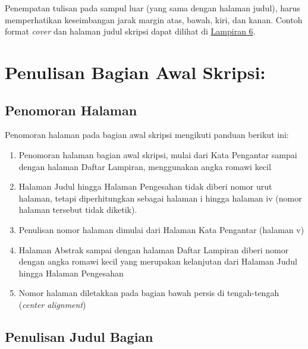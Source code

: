 \documentclass[
  indonesian,
  letterpaper,
]{scrbook}
\providecommand{\tightlist}{%
  \setlength{\itemsep}{0pt}\setlength{\parskip}{0pt}}
\begin{document}
Penempatan tulisan pada sampul luar (yang sama dengan halaman judul),
harus memperhatikan keseimbangan jarak margin atas, bawah, kiri, dan
kanan. Contoh format \emph{cover} dan halaman judul skripsi dapat
dilihat di \hyperref[_Lampiran_6_Contoh]{Lampiran 6}.

\section{Penulisan Bagian Awal
Skripsi:}\label{penulisan-bagian-awal-skripsi}

\subsection{Penomoran Halaman}\label{penomoran-halaman}

Penomoran halaman pada bagian awal skripsi mengikuti panduan berikut
ini:

\begin{enumerate}
\def\labelenumi{\alph{enumi}.}
\tightlist
\item
  Penomoran halaman bagian awal skripsi, mulai dari Kata Pengantar
  sampai dengan halaman Daftar Lampiran, menggunakan angka romawi kecil
\item
  Halaman Judul hingga Halaman Pengesahan tidak diberi nomor urut
  halaman, tetapi diperhitungkan sebagai halaman i hingga halaman iv
  (nomor halaman tersebut tidak diketik).
\item
  Penulisan nomor halaman dimulai dari Halaman Kata Pengantar (halaman
  v)
\item
  Halaman Abstrak sampai dengan halaman Daftar Lampiran diberi nomor
  dengan angka romawi kecil yang merupakan kelanjutan dari Halaman Judul
  hingga Halaman Pengesahan
\item
  Nomor halaman diletakkan pada bagian bawah persis di tengah-tengah
  (\emph{center alignment})
\end{enumerate}

\subsection{Penulisan Judul Bagian}\label{penulisan-judul-bagian}
\end{document}
